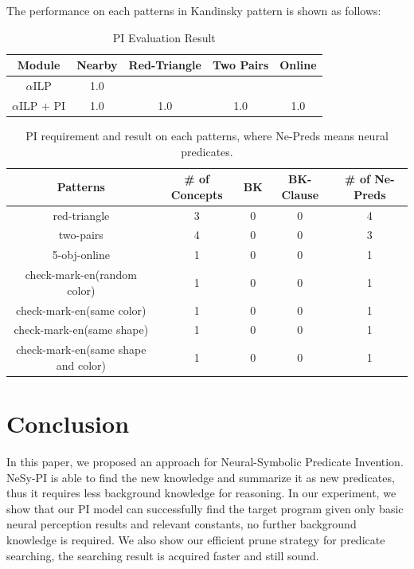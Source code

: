 \documentclass[
]{ceurart}
\begin{document}
The performance on each patterns in Kandinsky pattern is shown as follows:
\begin{table}
	\caption{PI Evaluation Result}
	\label{tab:nearby-pi-result}
	\begin{tabular}{ccccc}
		\toprule
		Module              & Nearby & Red-Triangle & Two Pairs & Online\\
		\midrule
		$\alpha$ILP 	    & 1.0 	    & 		    & 		    &           \\
		$\alpha$ILP + PI    & 	1.0 	& 1.0	& 1.0	    &  1.0    \\
		\bottomrule
	\end{tabular}
\end{table}



\begin{table}
	\centering
	\caption{PI requirement and result on each patterns, where Ne-Preds means neural predicates.}
	\label{tab:pi-result}
	\begin{tabular}{ccccc}
		\toprule
		Patterns      &  \# of Concepts      & BK & BK-Clause & \# of Ne-Preds \\
		\midrule
		red-triangle &	3  & 0 	    & 	0	    &  4           \\
		two-pairs   & 	4	& 	0 	& 0	& 3	        \\
		5-obj-online &	1	& 	0 	& 0	&  	 1     \\
		check-mark-en(random color) &	1	& 	0 	& 0	&  	 1    \\
		check-mark-en(same color) &	1	& 	0 	& 0	&  	 1      \\
		check-mark-en(same shape) &	1	& 	0 	& 0	&  	 1      \\
		check-mark-en(same shape and color) &	1	& 	0 	& 0	&  	 1   \\
		\bottomrule
	\end{tabular}
\end{table}



\section{Conclusion}

In this paper, we proposed an approach for Neural-Symbolic Predicate Invention. NeSy-PI is able to find the new knowledge and summarize it as new predicates, thus it requires less background knowledge for reasoning.
In our experiment, we show that our PI model can successfully find the target program given only basic neural perception results and relevant constants, no further background knowledge is required. We also show our efficient prune strategy for predicate searching, the searching result is acquired faster and still sound.
\end{document}
